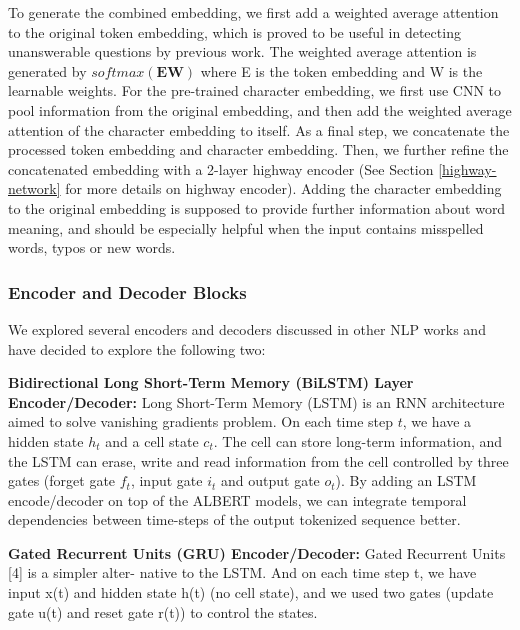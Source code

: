 \documentclass{article}
\begin{document}
To generate the combined embedding, we first add a weighted average attention to the original token embedding, which is proved to be useful in detecting unanswerable questions by previous work. \citep{weighted-average-attention} The weighted average attention is generated by $softmax(\textbf{E}\textbf{W})$ where E is the token embedding and W is the learnable weights. For the pre-trained character embedding, we first use CNN to pool information from the original embedding, and then add the weighted average attention of the character embedding to itself. As a final step, we concatenate the processed token embedding and character embedding. Then, we further refine the concatenated embedding with a 2-layer highway encoder (See Section \ref{highway-network} for more details on highway encoder). Adding the character embedding to the original embedding is supposed to provide further information about word meaning, and should be especially helpful when the input contains misspelled words, typos or new words.

\subsubsection{Encoder and Decoder Blocks}
We explored several encoders and decoders discussed in other NLP works and have decided to explore the following two:

\textbf{Bidirectional Long Short-Term Memory (BiLSTM) Layer Encoder/Decoder:} Long Short-Term Memory (LSTM) is an RNN architecture aimed to solve vanishing gradients problem. On each time step $t$, we have a hidden state $h_t$ and a cell state $c_t$. The cell can store long-term information, and the LSTM can erase, write and read information from the cell controlled by three gates (forget gate $f_t$, input gate $i_t$ and output gate $o_t$). By adding an LSTM encode/decoder on top of the ALBERT models, we can integrate temporal dependencies between time-steps of the output tokenized sequence better. \citep{lstm}

\textbf{Gated Recurrent Units (GRU) Encoder/Decoder:} Gated Recurrent Units [4] is a simpler alter- native to the LSTM. And on each time step t, we have input x(t) and hidden state h(t) (no cell state), and we used two gates (update gate u(t) and reset gate r(t)) to control the states. \citep{gru}
\end{document}
